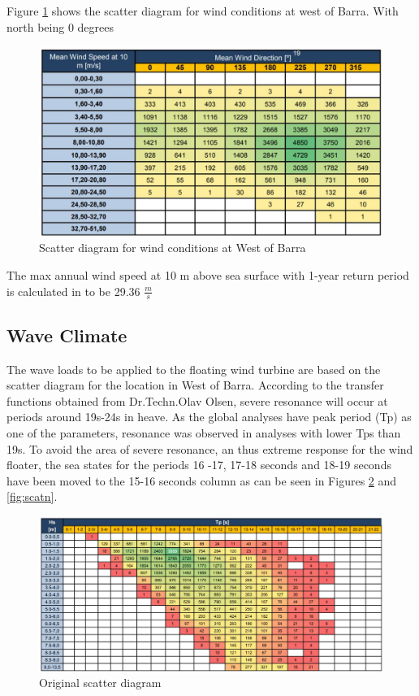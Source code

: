 \noindent Figure \ref{fig:scatterwind} shows the scatter diagram for wind conditions at west of Barra. With north being 0 degrees

\begin{figure}[H]
\centering
\includegraphics[scale=0.7]{figures/scatterwind}
\caption[$\; \:$Scatter diagram for wind conditions]{Scatter diagram for wind conditions at West of Barra \cite{Lifes50+D1.1} }
 \label{fig:scatterwind}
\end{figure}
 
 \noindent The max annual wind speed at 10 m above sea surface with 1-year return period is calculated in \cite{Lifes50+D1.1} to be  29.36 $\frac{m}{s}$



\subsection{Wave Climate}
The wave loads to be applied to the floating wind turbine are based on the scatter diagram for the location in West of Barra. According to the transfer functions obtained from Dr.Techn.Olav Olsen, severe resonance will occur at periods around 19s-24s in heave. As the global analyses have peak period (Tp) as one of the parameters, resonance was observed in analyses with lower Tps than 19s. To avoid the area of severe resonance, an thus extreme response for the wind floater, the sea states for the periods 16 -17, 17-18 seconds and 18-19 seconds have been moved to the 15-16 seconds column as can be seen in Figures \ref{fig:scato} and \ref{fig:scatn}.

\begin{figure}[H]
\centering
\includegraphics[scale=0.5]{figures/scatteroriginal}
\caption[$\; \:$Original scatter diagram]{Original scatter diagram \cite{Lifes50+D1.1} }
 \label{fig:scato}
\end{figure}

